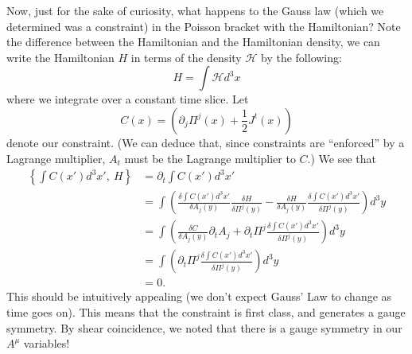 Now, just for the sake of curiosity, what happens to the Gauss
law (which we determined was a constraint) in the Poisson bracket
with the Hamiltonian? Note the difference between the Hamiltonian
and the Hamiltonian density, we can write the Hamiltonian $H$ in
terms of the density $\mathcal{H}$ by the following:
\begin{equation}%
H = \int \mathcal{H} d^{3}x
\end{equation}
where we integrate over a constant time slice. Let
\begin{equation}%
C(x) = (\partial_{j}\Pi^{j}(x)+\frac{1}{2}J^{t}(x))
\end{equation}
denote our constraint. (We can deduce that, since constraints are
``enforced'' by a Lagrange multiplier, $A_{t}$ must be the
Lagrange multiplier to $C$.) We see that
\begin{subequations}
\begin{align}
\left\{\int C(x')d^{3}x',~H\right\} &= \partial_{t}\int C(x')d^{3}x'\\
&= \int\left(\frac{\delta\int C(x')d^{3}x'}{\delta
  A_{j}(y)}\frac{\delta H}{\delta \Pi^{j}(y)} -\frac{\delta H}{\delta
  A_{j}(y)}\frac{\delta \int C(x')d^{3}x'}{\delta \Pi^{j}(y)} \right) d^{3}y \\
&= \int\left(\frac{\delta C}{\delta
  A_{j}(y)}\partial_{t}A_{j} +\partial_{t}\Pi^{j}
\frac{\delta \int C(x')d^{3}x'}{\delta \Pi^{j}(y)} \right) d^{3}y\\
&= \int\left(\partial_{t}\Pi^{j}\frac{\delta \int C(x')d^{3}x'}{\delta \Pi^{j}(y)}\right) d^{3}y\\
&= 0.
\end{align}
\end{subequations}
This should be intuitively appealing (we don't expect Gauss' Law
to change as time goes on). This means that the constraint is
first class, and generates a gauge symmetry. By shear
coincidence, we noted that there is a gauge symmetry in our
$A^{\mu}$ variables!

